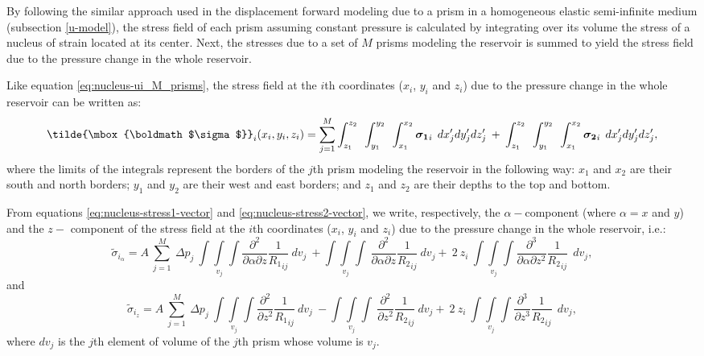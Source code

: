 \documentclass[journal abbreviation, manuscript]{copernicus}
\begin{document}
By following the similar approach used in the displacement forward modeling due to a prism in a homogeneous elastic semi-infinite medium (subsection \ref{u-model}), the stress field of each prism assuming constant pressure is calculated by integrating over its volume the stress of a nucleus of strain located at its center. 
Next, the stresses due to a set of $M$ prisms modeling the reservoir is summed to yield the stress field  due to the pressure change in the whole reservoir.

Like equation \ref{eq:nucleus-ui_M_prisms}, the stress field at the $i$th coordinates ($x_i$, $y_i$  and $z_i$) due to the pressure change in the whole reservoir can be written as:
\begin{equation}
\tilde{\mbox{\boldmath$\sigma$}}_{i}(x_i,y_i,z_i)
= \sum_{j=1}^{M} 
\int_{z_1}^{z_2} \:\:
\int_{y_1}^{y_2} \:\: 
\int_{x_1}^{x_2} 
\mbox{\boldmath$\sigma_{1}$}_{i}\: \:  dx^{\prime}_j dy^{\prime}_j dz^{\prime}_j 
\: + \: 
\int_{z_1}^{z_2} \:\:
\int_{y_1}^{y_2} \:\: 
\int_{x_1}^{x_2} 
\mbox{\boldmath$\sigma_{2}$}_{i} \:\:  dx^{\prime}_j dy^{\prime}_j dz^{\prime}_j, 
\label{eq:nucleus-stress_M_prisms}
\end{equation}
where the limits of the integrals represent the borders of the $j$th prism modeling the reservoir in the following way: $x_1$ and $x_2$ are their south and north borders; $y_1$ and  $y_2$ are their  west and east borders;  and $z_1$ and $z_2$ are their depths to the top and bottom.


From equations \ref{eq:nucleus-stress1-vector} and \ref{eq:nucleus-stress2-vector}, we write, respectively,  the $\alpha-$component (where  $\alpha = x$ and $y$) and the $z-$ component of the stress field at the $i$th coordinates ($x_i$, $y_i$  and $z_i$) due to the pressure change in the whole reservoir, i.e.:
\begin{equation}
{\tilde{\sigma}}_{{i}_\alpha} = A \: \sum_{j=1}^{M} 
\: \Delta p_{j}  \: \int\int\limits_{v_j}\int 
\frac{\partial^{2}}{\partial \alpha \partial z} {\frac{1}{{R_1}_{ij}}} \:  dv_j 
\: +   \int\int\limits_{v_j}\int
\: \frac{\partial^{2} }{\partial \alpha \partial z} {\frac{1}{{R_2}_{ij}}}\:  dv_j
+ \: 2 \: z_{i} \:  \int\int\limits_{v_j}\int
\frac{\partial^{3}  }{\partial \alpha \partial z ^{2}} {\frac{1}{{R_2}_{ij}}}  \:\:  dv_j, 
\label{eq:stress_til_alpha}
\end{equation}
and 
\begin{equation}
{\tilde{\sigma}}_{{i}_z} = A \: \sum_{j=1}^{M} 
\: \Delta p_{j}  \: \int\int\limits_{v_j}\int 
\frac{\partial^{2}}{\partial z^{2}} {\frac{1}{{R_1}_{ij}}} \:  dv_j 
\: -   \int\int\limits_{v_j}\int
\: \frac{\partial^{2} }{\partial z^{2}} {\frac{1}{{R_2}_{ij}}}\:  dv_j
+ \: 2 \: z_{i} \:  \int\int\limits_{v_j}\int
\frac{\partial^{3}  }{\partial z ^{3}} {\frac{1}{{R_2}_{ij}}}  \:\:  dv_j, 
\label{eq:stress_til_z}
\end{equation}
where $dv_j$ is the $j$th element of volume of the $j$th prism whose volume is $v_j$.
\end{document}
